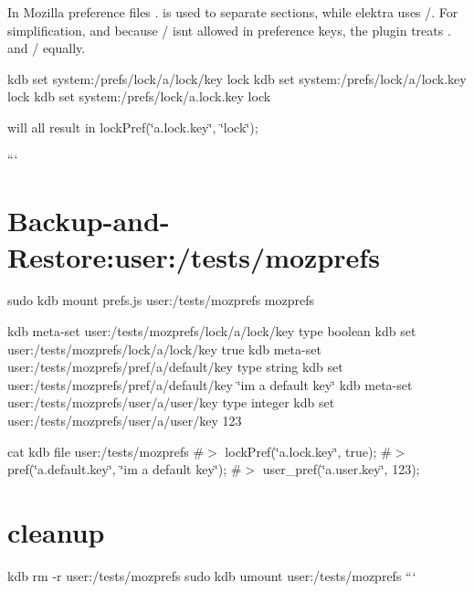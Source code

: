 In Mozilla preference files {\ttfamily .} is used to separate sections, while elektra uses {\ttfamily /}. For simplification, and because {\ttfamily /} isn\textquotesingle{}t allowed in preference keys, the plugin treats {\ttfamily .} and {\ttfamily /} equally.


\begin{DoxyCode}
kdb set system:/prefs/lock/a/lock/key lock
kdb set system:/prefs/lock/a/lock.key lock
kdb set system:/prefs/lock/a.lock.key lock
\end{DoxyCode}


will all result in {\ttfamily lock\+Pref(\char`\"{}a.\+lock.\+key\char`\"{}, \char`\"{}lock\char`\"{});}

``` \hypertarget{autotoc_md447_autotoc_md452}{}\section{Backup-\/and-\/\+Restore\+:user\+:/tests/mozprefs}\label{autotoc_md447_autotoc_md452}
sudo kdb mount prefs.\+js user\+:/tests/mozprefs mozprefs

kdb meta-\/set user\+:/tests/mozprefs/lock/a/lock/key type boolean kdb set user\+:/tests/mozprefs/lock/a/lock/key true kdb meta-\/set user\+:/tests/mozprefs/pref/a/default/key type string kdb set user\+:/tests/mozprefs/pref/a/default/key \char`\"{}i\textquotesingle{}m a default key\char`\"{} kdb meta-\/set user\+:/tests/mozprefs/user/a/user/key type integer kdb set user\+:/tests/mozprefs/user/a/user/key 123

cat {\ttfamily kdb file user\+:/tests/mozprefs} \#$>$ lock\+Pref(\char`\"{}a.\+lock.\+key\char`\"{}, true); \#$>$ pref(\char`\"{}a.\+default.\+key\char`\"{}, \char`\"{}i\textquotesingle{}m a default key\char`\"{}); \#$>$ user\+\_\+pref(\char`\"{}a.\+user.\+key\char`\"{}, 123);\hypertarget{autotoc_md447_autotoc_md453}{}\section{cleanup}\label{autotoc_md447_autotoc_md453}
kdb rm -\/r user\+:/tests/mozprefs sudo kdb umount user\+:/tests/mozprefs ``` 